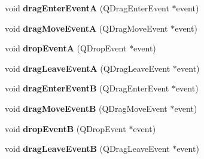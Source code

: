 \begin{DoxyCompactItemize}
\item 
\hypertarget{classofeli_1_1_image_viewer_a0221fa500f57db919935f19e9d57ad61}{void {\bfseries drag\-Enter\-Event\-A} (Q\-Drag\-Enter\-Event $\ast$event)}\label{classofeli_1_1_image_viewer_a0221fa500f57db919935f19e9d57ad61}

\item 
\hypertarget{classofeli_1_1_image_viewer_a7d7591aaec61bc0bab866bf956aeb2cf}{void {\bfseries drag\-Move\-Event\-A} (Q\-Drag\-Move\-Event $\ast$event)}\label{classofeli_1_1_image_viewer_a7d7591aaec61bc0bab866bf956aeb2cf}

\item 
\hypertarget{classofeli_1_1_image_viewer_a77d68507e7e4cd9b3389273f0686d343}{void {\bfseries drop\-Event\-A} (Q\-Drop\-Event $\ast$event)}\label{classofeli_1_1_image_viewer_a77d68507e7e4cd9b3389273f0686d343}

\item 
\hypertarget{classofeli_1_1_image_viewer_aabc8e8fb012a80f28ac53ad40de01af1}{void {\bfseries drag\-Leave\-Event\-A} (Q\-Drag\-Leave\-Event $\ast$event)}\label{classofeli_1_1_image_viewer_aabc8e8fb012a80f28ac53ad40de01af1}

\item 
\hypertarget{classofeli_1_1_image_viewer_a239d538d35bef805d3b3f609f7abc5b8}{void {\bfseries drag\-Enter\-Event\-B} (Q\-Drag\-Enter\-Event $\ast$event)}\label{classofeli_1_1_image_viewer_a239d538d35bef805d3b3f609f7abc5b8}

\item 
\hypertarget{classofeli_1_1_image_viewer_ab4f1eb2554efc062d113866721fe8281}{void {\bfseries drag\-Move\-Event\-B} (Q\-Drag\-Move\-Event $\ast$event)}\label{classofeli_1_1_image_viewer_ab4f1eb2554efc062d113866721fe8281}

\item 
\hypertarget{classofeli_1_1_image_viewer_a578e38fbffd1091180c0ffed733c4639}{void {\bfseries drop\-Event\-B} (Q\-Drop\-Event $\ast$event)}\label{classofeli_1_1_image_viewer_a578e38fbffd1091180c0ffed733c4639}

\item 
\hypertarget{classofeli_1_1_image_viewer_a6bdf1b35756153bcffe193200315d643}{void {\bfseries drag\-Leave\-Event\-B} (Q\-Drag\-Leave\-Event $\ast$event)}\label{classofeli_1_1_image_viewer_a6bdf1b35756153bcffe193200315d643}

\end{DoxyCompactItemize}
